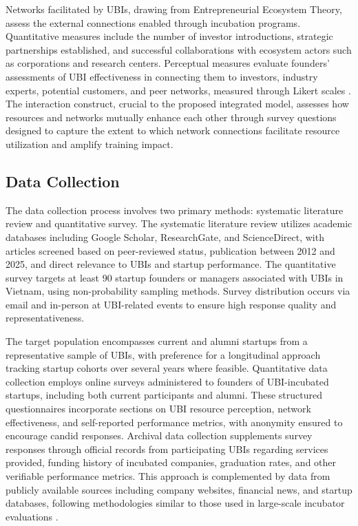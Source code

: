 \documentclass[../Main.tex]{subfiles}
\begin{document}
    Networks facilitated by UBIs, drawing from Entrepreneurial Ecosystem Theory, assess the external connections enabled through incubation programs. Quantitative measures include the number of investor introductions, strategic partnerships established, and successful collaborations with ecosystem actors such as corporations and research centers. Perceptual measures evaluate founders' assessments of UBI effectiveness in connecting them to investors, industry experts, potential customers, and peer networks, measured through Likert scales \cite{theodorakopoulos2014business, harper2018makes}. The interaction construct, crucial to the proposed integrated model, assesses how resources and networks mutually enhance each other through survey questions designed to capture the extent to which network connections facilitate resource utilization and amplify training impact.

    \subsection{Data Collection}
    \label{subsection:4.2.2_Data_collection}
    The data collection process involves two primary methods: systematic literature review and quantitative survey. The systematic literature review utilizes academic databases including Google Scholar, ResearchGate, and ScienceDirect, with articles screened based on peer-reviewed status, publication between 2012 and 2025, and direct relevance to UBIs and startup performance. The quantitative survey targets at least 90 startup founders or managers associated with UBIs in Vietnam, using non-probability sampling methods. Survey distribution occurs via email and in-person at UBI-related events to ensure high response quality and representativeness.

    The target population encompasses current and alumni startups from a representative sample of UBIs, with preference for a longitudinal approach tracking startup cohorts over several years where feasible. Quantitative data collection employs online surveys administered to founders of UBI-incubated startups, including both current participants and alumni. These structured questionnaires incorporate sections on UBI resource perception, network effectiveness, and self-reported performance metrics, with anonymity ensured to encourage candid responses. Archival data collection supplements survey responses through official records from participating UBIs regarding services provided, funding history of incubated companies, graduation rates, and other verifiable performance metrics. This approach is complemented by data from publicly available sources including company websites, financial news, and startup databases, following methodologies similar to those used in large-scale incubator evaluations \cite{patton2014realising}.
\end{document}
